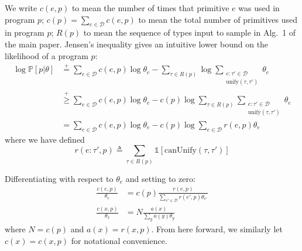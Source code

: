 \documentclass{article}
\DeclareMathOperator*{\argmax}{arg\,max} %
\newcommand{\indicator}{\mathds{1}} %
\newcommand{\expect}{\mathds{E}} %
\newcommand{\probability}{\mathds{P}} %
\begin{document}
We write $c(e,p)$ to mean the number of times that primitive $e$ was used in program $p$; $c(p)= \sum_{e\in \mathcal{D}}c(e,p)$ to mean the total number of primitives used in program $p$; $R(p)$ to mean the sequence of types input to sample in Alg.~1 of the main paper. Jensen's inequality gives an intuitive lower bound on the likelihood of a program $p$:
\begin{align*}
  \log \probability[p|\theta]&\stackrel{+}{ = }\sum_{e\in \mathcal{D}} c(e,p)\log \theta_e - \sum_{\tau\in R(p)} \log \sum_{\substack{e:\tau'\in \mathcal{D}\\\text{unify}(\tau,\tau')}}\theta_e\\
  &\stackrel{+}{\geq }\sum_{e\in \mathcal{D}} c(e,p)\log \theta_e - c(p)\log \sum_{\tau\in R(p)} \sum_{\substack{e:\tau'\in \mathcal{D}\\\text{unify}(\tau,\tau')}}\theta_e\\
  & = \sum_{e\in \mathcal{D}} c(e,p)\log \theta_e - c(p)\log \sum_{e\in \mathcal{D}} r(e,p)\theta_e
\end{align*}
where we have defined
$$r(e:\tau',p)\triangleq\sum_{\tau\in R(p)} \indicator[\text{canUnify}(\tau,\tau')]$$





Differentiating with respect to $\theta_e$ and setting to zero:
\begin{align*}
  \frac{c(e, p)}{\theta_e} &= c(p)\frac{r(e, p)}{\sum_{e'\in\mathcal{D}} r(e', p)\theta_{e'}} \\
  \frac{c(x,p)}{\theta_x} &= N\frac{a(x)}{\sum_y a(y)\theta_y}
\end{align*}
where $N=c(p)$ and $a(x) = r(x, p)$. From here forward, we similarly let
$c(x)=c(x,p)$ for notational convenience.
\end{document}
